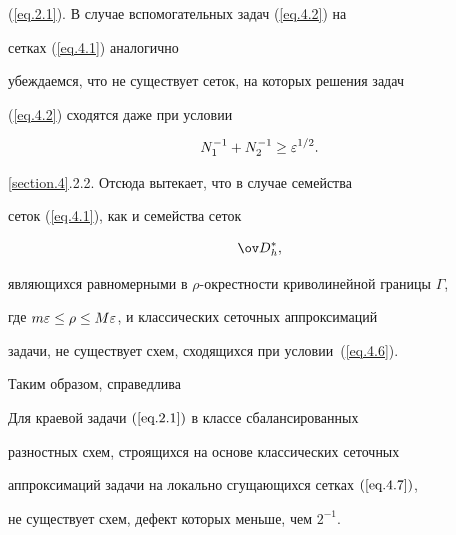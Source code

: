 (\ref{eq.2.1}). В случае вспомогательных задач (\ref{eq.4.2}) на


сетках (\ref{eq.4.1}) аналогично 


убеждаемся, что не существует сеток, на которых решения задач


(\ref{eq.4.2}) сходятся даже при условии


\begin{equation}\label{eq.4.6}


N_1^{-1}+N_2^{-1}\geq\eps^{1/2}.


\end{equation}





{\ref{section.4}.2.2.} Отсюда вытекает, что в случае семейства


сеток (\ref{eq.4.1}), как и семейства сеток


\begin{equation}\label{eq.4.7}


\od{}_h^*,


\end{equation}


являющихся равномерными в $\rho$-окрестности криволинейной границы $\varGamma$,


где $m\varepsilon\leq\rho\leq M\varepsilon$, и классических сеточных аппроксимаций


задачи, не существует схем, сходящихся при условии~(\ref{eq.4.6}).





Таким образом, справедлива





\begin{thms} \label{t4.1}


Для краевой задачи $(\ref{eq.2.1})$ в классе сбалансированных


разностных схем, строящихся на основе классических сеточных


аппроксимаций задачи на локально сгущающихся сетках $(\ref{eq.4.7})$,


не существует схем, дефект которых меньше, чем $2^{-1}$.


\end{thms}





